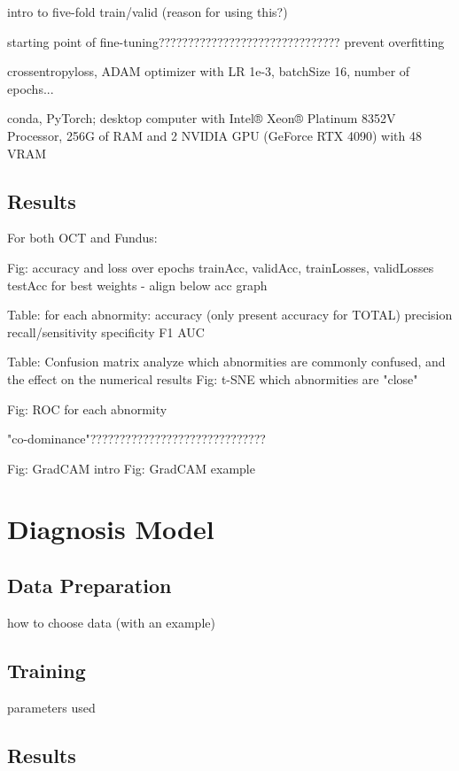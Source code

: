 \documentclass{article}
\begin{document}
			intro to five-fold train/valid (reason for using this?)
			
			starting point of fine-tuning???????????????????????????????
			prevent overfitting
			
			crossentropyloss, ADAM optimizer with LR 1e-3, batchSize 16, number of epochs...
			
			conda, PyTorch;
			desktop computer with Intel® Xeon® Platinum 8352V Processor, 256G of RAM and 2 NVIDIA GPU (GeForce RTX 4090) with 48 VRAM
			
		\subsection{Results}
			
			For both OCT and Fundus:
			
				Fig: accuracy and loss over epochs
					trainAcc, validAcc, trainLosses, validLosses
					testAcc for best weights - align below acc graph
					
				Table: for each abnormity:
					accuracy (only present accuracy for TOTAL)
					precision
					recall/sensitivity
					specificity
					F1
					AUC
					
				Table: Confusion matrix
					analyze which abnormities are commonly confused, and the effect on the numerical results
				Fig: t-SNE
					which abnormities are "close"
				
				Fig: ROC for each abnormity
				
			"co-dominance"??????????????????????????????
				
			Fig: GradCAM intro
			Fig: GradCAM example
		
	\section{Diagnosis Model}
	
		\subsection{Data Preparation}
		
			how to choose data (with an example)
			
		
		\subsection{Training}
		
			parameters used
		
		\subsection{Results}
			
\end{document}
